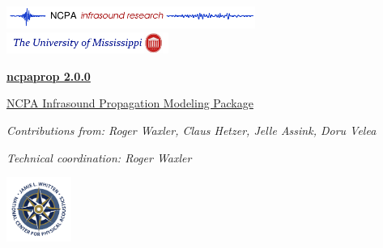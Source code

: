 \documentclass[10pt]{article}
\newcommand{\version}{2.0.0}
\begin{document}
\newpage

\vspace*{-50pt}
\includegraphics[width=230pt]{figs/logos/color_logo_UTTR.pdf}
\hspace*{65pt}
\includegraphics[width=150pt]{figs/logos/UM_logo.png}
\vspace*{50pt}


\vspace*{0.05\textheight}

\begin{center}

\begin{Huge} \underline{\textbf{ncpaprop \version}} \end{Huge} 

\vspace*{0.025\textheight} 

\begin{Large}
\underline{NCPA Infrasound Propagation Modeling Package}
\end{Large} 

\vspace*{0.06\textheight}

\textsl{Contributions from: Roger Waxler, Claus Hetzer, Jelle Assink, Doru Velea}

\vspace*{0.02\textheight}

\textsl{Technical coordination: Roger Waxler}

\end{center}

\vspace*{0.06\textheight}

\begin{center}
\includegraphics[height=60pt]{figs/logos/NCPA-Logo-Crest.pdf}
\quad
{}

\end{center}
\end{document}
